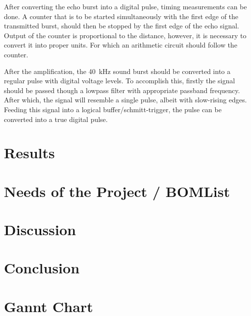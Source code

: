 \documentclass[12pt, a4paper]{article}
\begin{document}
    After converting the echo burst into a digital pulse, timing measurements can be done. A counter that is to be started simultaneously with the first edge of the transmitted burst, should then be stopped by the first edge of the echo signal. Output of the counter is proportional to the distance, however, it is necessary to convert it into proper units. For which an arithmetic circuit should follow the counter.
	
	    
   \pagebreak
   
   
    
       
    \bigskip
    After the amplification, the \SI{40}{\kilo\hertz} sound burst should be converted into a regular pulse with digital voltage levels. To accomplish this, firstly the signal should be passed though a lowpass filter with appropriate passband frequency. After which, the signal will resemble a single pulse, albeit with slow-rising edges. Feeding this signal into a logical buffer/schmitt-trigger, the pulse can be converted into a true digital pulse. 

    \pagebreak

    \section{Results}
    
    
        \pagebreak
            
    \section{Needs of the Project / BOMList}

      
    \pagebreak
     \section{Discussion}
     
      \pagebreak
     \section{Conclusion}
     
     \pagebreak
    \section{Gannt Chart}
\end{document}
